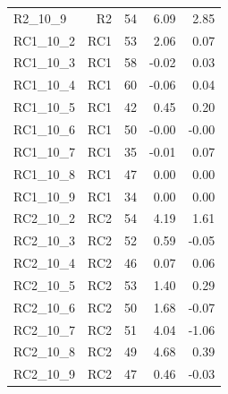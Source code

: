 \begin{longtable}{@{}lrrrr@{}}
R2\_10\_9 & R2 & 54 & 6.09 & 2.85 \\
RC1\_10\_2 & RC1 & 53 & 2.06 & 0.07 \\
RC1\_10\_3 & RC1 & 58 & -0.02 & 0.03 \\
RC1\_10\_4 & RC1 & 60 & -0.06 & 0.04 \\
RC1\_10\_5 & RC1 & 42 & 0.45 & 0.20 \\
RC1\_10\_6 & RC1 & 50 & -0.00 & -0.00 \\
RC1\_10\_7 & RC1 & 35 & -0.01 & 0.07 \\
RC1\_10\_8 & RC1 & 47 & 0.00 & 0.00 \\
RC1\_10\_9 & RC1 & 34 & 0.00 & 0.00 \\
RC2\_10\_2 & RC2 & 54 & 4.19 & 1.61 \\
RC2\_10\_3 & RC2 & 52 & 0.59 & -0.05 \\
RC2\_10\_4 & RC2 & 46 & 0.07 & 0.06 \\
RC2\_10\_5 & RC2 & 53 & 1.40 & 0.29 \\
RC2\_10\_6 & RC2 & 50 & 1.68 & -0.07 \\
RC2\_10\_7 & RC2 & 51 & 4.04 & -1.06 \\
RC2\_10\_8 & RC2 & 49 & 4.68 & 0.39 \\
RC2\_10\_9 & RC2 & 47 & 0.46 & -0.03 \\
\bottomrule
\end{longtable}
\endgroup
